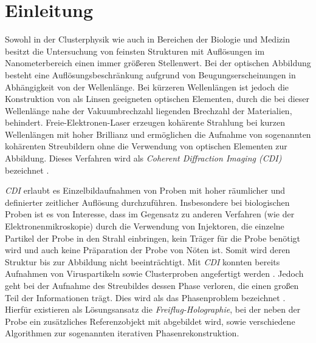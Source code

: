 \chapter{Einleitung}
Sowohl in der Clusterphysik wie auch in Bereichen der Biologie und Medizin besitzt die Untersuchung von feinsten Strukturen mit Auflösungen im Nanometerbereich einen immer größeren Stellenwert. Bei der optischen Abbildung besteht eine Auflösungsbeschränkung aufgrund von Beugungserscheinungen in Abhängigkeit von der Wellenlänge. Bei kürzeren Wellenlängen ist jedoch die Konstruktion von als Linsen geeigneten optischen Elementen, durch die bei dieser Wellenlänge nahe der Vakuumbrechzahl liegenden Brechzahl der Materialien, behindert.
Freie-Elektronen-Laser erzeugen kohärente Strahlung bei kurzen Wellenlängen mit hoher Brillianz und ermöglichen die Aufnahme von sogenannten kohärenten Streubildern ohne die Verwendung von optischen Elementen zur Abbildung. Dieses Verfahren wird als \textit{Coherent Diffraction Imaging (CDI)} bezeichnet \cite{schultz2013chapter7}.

\textit{CDI} erlaubt es Einzelbildaufnahmen von Proben mit hoher räumlicher und definierter zeitlicher Auflösung durchzuführen. Insbesondere bei biologischen Proben ist es von Interesse, dass im Gegensatz zu anderen Verfahren (wie der Elektronenmikroskopie) durch die Verwendung von Injektoren, die einzelne Partikel der Probe in den Strahl einbringen, kein Träger für die Probe benötigt wird und auch keine Präparation der Probe von Nöten ist. Somit wird deren Struktur bis zur Abbildung nicht beeinträchtigt. Mit \textit{CDI} konnten bereits Aufnahmen von Viruspartikeln sowie Clusterproben angefertigt werden \cite{seibert2011}. Jedoch geht bei der Aufnahme des Streubildes dessen Phase verloren, die einen großen Teil der Informationen trägt. Dies wird als das Phasenproblem bezeichnet \cite{shechtman2015}. Hierfür existieren als Lösungsansatz die \textit{Freiflug-Holographie}, bei der neben der Probe ein zusätzliches Referenzobjekt mit abgebildet wird, sowie verschiedene Algorithmen zur sogenannten  iterativen Phasenrekonstruktion.

